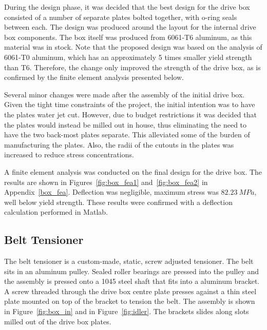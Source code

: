 During the design phase, it was decided that the best design for the drive box consisted of a number of separate plates bolted together, with o-ring seals between each. The design was produced around the layout for the internal drive box components. The box itself was produced from 6061-T6 aluminum, as this material was in stock. Note that the proposed design was based on the analysis of 6061-T0 aluminum, which has an approximately 5 times smaller yield  strength than T6. Therefore, the change only improved the strength of the drive box, as is confirmed by the finite element analysis presented below.

Several minor changes were made after the assembly of the initial drive box. Given the tight time constraints of the project, the initial intention was to have the plates water jet cut. However, due to budget restrictions it was decided that the plates would instead be milled out in house, thus eliminating the need to have the two back-most plates separate. This alleviated some of the burden of manufacturing the plates. Also, the radii of the cutouts in the plates was increased to reduce stress concentrations.

A finite element analysis was conducted on the final design for the drive box. The results are shown in Figures~\ref{fig:box_fea1} and~\ref{fig:box_fea2} in Appendix~\ref{box_fea}. Deflection was negligible, maximum stress was ${82.23\ MPa}$, well below yield strength. These results were confirmed with a deflection calculation performed in Matlab.


\subsection{Belt Tensioner}

The belt tensioner is a custom-made, static, screw adjusted tensioner. The belt sits in an aluminum pulley. Sealed roller bearings are pressed into the pulley and the assembly is pressed onto a 1045 steel shaft that fits into a aluminum bracket. A screw threaded through the drive box centre plate presses against a thin steel plate mounted on top of the bracket to tension the belt. The assembly is shown in Figure~\ref{fig:box_in} and in Figure~\ref{fig:idler}. The brackets slides along slots milled out of the drive box plates.

